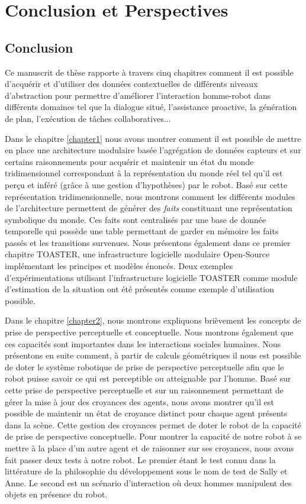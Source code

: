 \documentclass[a4paper,11pt,twoside]{StyleThese}
\begin{document}
\fi


\chapter*{Conclusion et Perspectives}

\section{Conclusion}
Ce manuscrit de thèse rapporte à travers cinq chapitres comment il est possible d'acquérir et d'utiliser des données contextuelles de différents niveaux d'abstraction pour permettre d'améliorer l'interaction homme-robot dans différents domaines tel que la dialogue situé, l'assistance proactive, la génération de plan, l'exécution de tâches collaboratives...

Dans le chapitre \ref{chapter1} nous avons montrer comment il est possible de mettre en place une architecture modulaire basée l'agrégation de données capteurs et sur certains raisonnements pour acquérir et maintenir un état du monde tridimensionnel correspondant à la représentation du monde réel tel qu'il est perçu et inféré (grâce à une gestion d'hypothèses) par le robot. Basé sur cette représentation tridimensionnelle, nous montrons comment les différents modules de l'architecture permettent de générer des \textit{faits} constituant une représentation symbolique du monde. Ces faits sont centralisés par une base de donnée temporelle qui possède une table permettant de garder en mémoire les faits passés et les transitions survenues. Nous présentons également dans ce premier chapitre TOASTER, une infrastructure logicielle modulaire Open-Source implémentant les principes et modèles énoncés.
Deux exemples d'expérimentations utilisant l'infrastructure logicielle TOASTER comme module d'estimation de la situation ont été présentés comme exemple d'utilisation possible.

Dans le chapitre \ref{chapter2}, nous montrons expliquons brièvement les concepts de prise de perspective perceptuelle et conceptuelle. Nous montrons également que ces capacités sont importantes dans les interactions sociales humaines. Nous présentons en suite comment, à partir de calculs géométriques il nous est possible de doter le système robotique de prise de perspective perceptuelle afin que le robot puisse savoir ce qui est perceptible ou atteignable par l'homme.
Basé sur cette prise de perspective perceptuelle et sur un raisonnement permettant de gérer la mise à jour des croyances des agents, nous avons montrer qu'il est possible de maintenir un état de croyance distinct pour chaque agent présents dans la scène. Cette gestion des croyances permet de doter le robot de la capacité de prise de perspective conceptuelle.
Pour montrer la capacité de notre robot à se mettre à la place d'un autre agent et de raisonner sur ses croyances, nous avons fait passer deux tests à notre robot. Le premier étant le test connu dans la littérature de la philosophie du développement sous le nom de test de Sally et Anne. Le second est un scénario d'interaction où deux hommes manipulent des objets en présence du robot.
\end{document}
